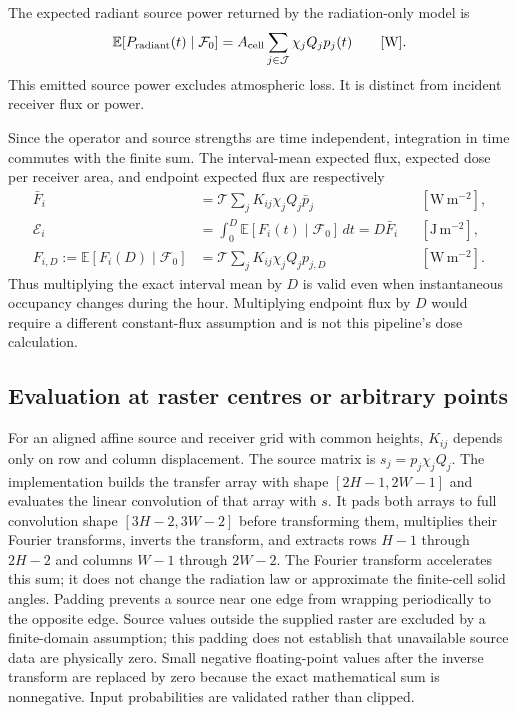 \documentclass[11pt,a4paper]{article}
\newcommand{\E}{\mathbb{E}}
\begin{document}
The expected radiant source power returned by the radiation-only model is
\begin{equation}
 \E[P_{\rm radiant}(t)\mid\mathcal F_0]
 =A_{\rm cell}\sum_{j\in\mathcal J}\chi_jQ_jp_j(t)
 \qquad[\mathrm W].
 \label{eq:heat-source-power}
\end{equation}
This emitted source power excludes atmospheric loss. It is distinct from
incident receiver flux or power.

Since the operator and source strengths are time independent, integration
in time commutes with the finite sum. The interval-mean expected flux,
expected dose per receiver area, and endpoint expected flux are respectively
\begin{align}
 \bar F_i&=\mathcal T\sum_j K_{ij}\chi_jQ_j\bar p_j
           &&[\mathrm{W\,m^{-2}}],\\
 \mathcal E_i&=\int_0^D\E[F_i(t)\mid\mathcal F_0]\,dt
             =D\bar F_i
           &&[\mathrm{J\,m^{-2}}],\\
 F_{i,D}:=\E[F_i(D)\mid\mathcal F_0]&=\mathcal T\sum_j K_{ij}\chi_jQ_jp_{j,D}
           &&[\mathrm{W\,m^{-2}}].
 \label{eq:heat-mean-dose}
\end{align}
Thus multiplying the exact interval mean by $D$ is valid even when
instantaneous occupancy changes during the hour. Multiplying endpoint flux
by $D$ would require a different constant-flux assumption and is not this
pipeline's dose calculation.

\subsection{Evaluation at raster centres or arbitrary points}
\label{sec:heat-evaluation}

For an aligned affine source and receiver grid with common heights,
$K_{ij}$ depends only on row and column displacement. The source matrix is
$s_j=p_j\chi_jQ_j$. The implementation builds the transfer array with
shape $[2H-1,2W-1]$ and evaluates the linear convolution of that array with
$s$. It pads both arrays to full convolution shape
$[3H-2,3W-2]$ before transforming them, multiplies their Fourier transforms,
inverts the transform, and extracts rows $H-1$ through $2H-2$ and columns
$W-1$ through $2W-2$. The Fourier transform accelerates this sum; it does
not change the radiation law or approximate the finite-cell solid angles.
Padding prevents a source near one edge from wrapping periodically to the
opposite edge. Source values outside the supplied raster are excluded by a
finite-domain assumption; this padding does not establish that unavailable
source data are physically zero. Small negative floating-point values after
the inverse transform are replaced by zero because the exact mathematical
sum is nonnegative. Input probabilities are validated rather than clipped.
\end{document}
